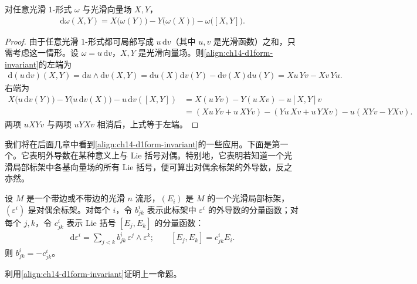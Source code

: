 \documentclass[../../main.tex]{subfiles}
\begin{document}
\begin{proposition}[$1$-形式的外导数]\label{proposition:ch14-d1form-invariant}
对任意光滑 $1$-形式 $\omega$ 与光滑向量场 $X,Y$，
\begin{align}
\mathrm{d}\omega(X,Y)=X\bigl(\omega(Y)\bigr)-Y\bigl(\omega(X)\bigr)-\omega\bigl([X,Y]\bigr).\label{align:ch14-d1form-invariant}
\end{align}
\end{proposition}

\begin{proof}
由于任意光滑 $1$-形式都可局部写成 $u\,\mathrm{d}v$（其中 $u,v$ 是光滑函数）之和，只需考虑这一情形。设 $\omega=u\,\mathrm{d}v$，$X,Y$ 是光滑向量场。则\eqref{align:ch14-d1form-invariant}的左端为
\begin{align*}
\mathrm{d}(u\,\mathrm{d}v)(X,Y)=\mathrm{d}u\wedge\mathrm{d}v(X,Y)=\mathrm{d}u(X)\mathrm{d}v(Y)-\mathrm{d}v(X)\mathrm{d}u(Y)=Xu\,Yv-Xv\,Yu.
\end{align*}
右端为
\begin{align*}
X\bigl(u\,\mathrm{d}v(Y)\bigr)-Y\bigl(u\,\mathrm{d}v(X)\bigr)-u\,\mathrm{d}v([X,Y])
&=X(u\,Yv)-Y(u\,Xv)-u[X,Y]v\\
&=(Xu\,Yv+u\,XYv)-(Yu\,Xv+u\,YXv)-u(XYv-YXv).
\end{align*}
两项 $uXYv$ 与两项 $uYXv$ 相消后，上式等于左端。
\end{proof}

我们将在后面几章中看到\eqref{align:ch14-d1form-invariant}的一些应用。下面是第一个。它表明外导数在某种意义上与 Lie 括号对偶。特别地，它表明若知道一个光滑局部标架中各基向量场的所有 Lie 括号，便可算出对偶余标架的外导数，反之亦然。

\begin{proposition}\label{proposition:ch14-frame-duality}
设 $M$ 是一个带边或不带边的光滑 $n$ 流形，$(E_i)$ 是 $M$ 的一个光滑局部标架，$(\varepsilon^i)$ 是对偶余标架。对每个 $i$，令 $b^i_{jk}$ 表示此标架中 $\varepsilon^i$ 的外导数的分量函数；对每个 $j,k$，令 $c^i_{jk}$ 表示 Lie 括号 $[E_j,E_k]$ 的分量函数：
\begin{align*}
\mathrm{d}\varepsilon^i=\sum_{j<k}b^i_{jk}\,\varepsilon^j\wedge\varepsilon^k;\qquad
[E_j,E_k]=c^i_{jk}E_i.
\end{align*}
则 $b^i_{jk}=-c^i_{jk}$。
\end{proposition}

\begin{exercise}\label{exercise:ch14-31}
利用\eqref{align:ch14-d1form-invariant}证明上一命题。
\end{exercise}
\end{document}
